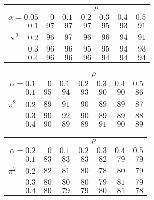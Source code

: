 \begin{tabular}{r|rrrrrr}
\hline\hline
 &\multicolumn{6}{c}{$\rho$} \\ 
 $\alpha = 0.05$ & $0$ & $0.1$ & $0.2$ & $0.3$ & $0.4$ & $0.5$ \\ 
 \hline$0.1$ & $97$ & $97$ & $97$ & $95$ & $93$ & $91$\\ 
$\pi^2\;\;\;$ $0.2$ & $96$ & $97$ & $96$ & $96$ & $94$ & $91$\\ 
$0.3$ & $96$ & $96$ & $95$ & $95$ & $94$ & $93$\\ 
$0.4$ & $96$ & $96$ & $96$ & $94$ & $94$ & $94$\\ 
 \hline 
 \end{tabular}
 
 \vspace{2em} 
 
\begin{tabular}{r|rrrrrr}
\hline\hline
 &\multicolumn{6}{c}{$\rho$} \\ 
 $\alpha = 0.1$ & $0$ & $0.1$ & $0.2$ & $0.3$ & $0.4$ & $0.5$ \\ 
 \hline$0.1$ & $95$ & $94$ & $93$ & $90$ & $90$ & $86$\\ 
$\pi^2\;\;\;$ $0.2$ & $89$ & $91$ & $90$ & $89$ & $89$ & $87$\\ 
$0.3$ & $90$ & $92$ & $90$ & $89$ & $89$ & $88$\\ 
$0.4$ & $90$ & $89$ & $89$ & $91$ & $90$ & $89$\\ 
 \hline 
 \end{tabular}
 
 \vspace{2em} 
 
\begin{tabular}{r|rrrrrr}
\hline\hline
 &\multicolumn{6}{c}{$\rho$} \\ 
 $\alpha = 0.2$ & $0$ & $0.1$ & $0.2$ & $0.3$ & $0.4$ & $0.5$ \\ 
 \hline$0.1$ & $83$ & $83$ & $83$ & $82$ & $79$ & $79$\\ 
$\pi^2\;\;\;$ $0.2$ & $82$ & $81$ & $80$ & $78$ & $80$ & $79$\\ 
$0.3$ & $80$ & $80$ & $80$ & $79$ & $81$ & $79$\\ 
$0.4$ & $80$ & $79$ & $79$ & $80$ & $81$ & $78$\\ 
 \hline 
 \end{tabular}